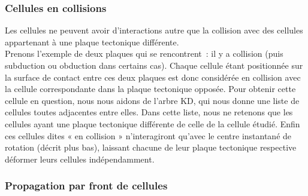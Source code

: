 \documentclass[a4paper,11pt]{article}
\begin{document}
\subsubsection{Cellules en collisions}

Les cellules ne peuvent avoir d'interactions autre que la collision avec des cellules appartenant à une plaque tectonique différente.\\
Prenons l'exemple de deux plaques qui se rencontrent~: il y a collision (puis subduction ou obduction dans certains cas).
Chaque cellule étant positionnée sur la surface de contact entre ces deux plaques est donc considérée en collision avec la cellule correspondante dans la plaque tectonique opposée.
Pour obtenir cette cellule en question, nous nous aidons de l'arbre KD, qui nous donne une liste de cellules toutes adjacentes entre elles.
Dans cette liste, nous ne retenons que les cellules ayant une plaque tectonique différente de celle de la cellule étudié.
Enfin ces cellules dites « en collision » n'interagiront qu'avec le centre instantané de rotation (décrit plus bas), laissant chacune de leur plaque tectonique respective déformer leurs cellules indépendamment.

\subsubsection{Propagation par front de cellules}
\end{document}
